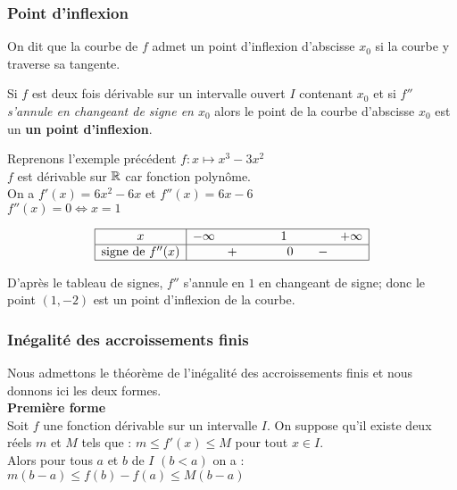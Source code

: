   \subsubsection*{Point d'inflexion}
  \begin{definition}
  On dit que la courbe de $ f $ admet un point d'inflexion d'abscisse $ x_{0} $ si la courbe y traverse sa tangente.
  \end{definition}

   \begin{theorem}
   Si $ f $ est deux fois dérivable sur  un intervalle ouvert $ I $ contenant $ x_0 $  et si $ f'' $  \emph{ s'annule en changeant de signe  en $ x_0 $} alors le point de la courbe d'abscisse $ x_0 $  est un \textbf{\color{magenta} un point  d'inflexion}.
   \end{theorem}
   
   \begin{example}
   Reprenons l'exemple précédent $ f: x\mapsto x^{3}-3x^{2} $\\ 
   $ f $ est dérivable sur $ \mathbb{R} $ car fonction polynôme.\\
   On a $ f'(x)= 6x^2-6x$ et $ f''(x)= 6x-6 $\\
   $ f''(x)=0 \Longleftrightarrow x=1 $
   \renewcommand{\arraystretch}{1.5}

 \[\begin{array}{|c|ccccc|}
\hline
x & -\infty & & 1 & & +\infty\\ \hline
\text{signe de } f''(x) & & +\qquad &\quad 0  & \quad - & \\
\hline
\end{array}\]

D'après le tableau de signes,  $ f'' $ s'annule en  $ 1 $ en changeant de signe; donc le point $ (1,-2) $ est un point d'inflexion de la courbe.
   \end{example}
   
  \subsubsection*{Inégalité des accroissements finis}
  Nous admettons le théorème de l'inégalité des accroissements finis et nous donnons ici les deux formes.\\
\textbf{\color{magenta}Première forme} \\
 Soit $ f $ une fonction dérivable sur un intervalle $ I $. On suppose qu'il existe deux réels $m $ et $ M$ tels que :\colorbox{green!20!}{ $ m\leq f'(x) \leq M $} \quad pour tout $ x\in I $. \\ Alors pour tous $a $ et $ b$ de $ I $  $(b < a)  $ on a :\colorbox{green!20!} {$ m(b-a)\leq f(b)-f(a) \leq M(b-a) $}  \\
 
